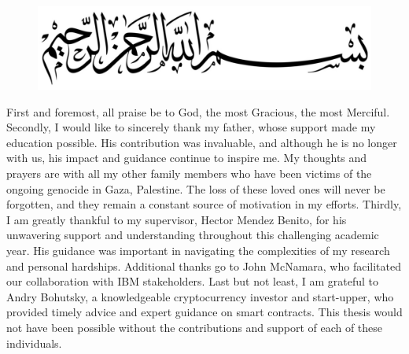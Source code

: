 \begin{figure}[h!]
    \centering
    \includegraphics[width=0.92\linewidth]{LATEX/Appendices/Images/Acknowledgment/bismilLah.jpg}
    \label{fig:beesmiLah}
\end{figure}
\vspace{-10pt}

\hspace{-6.53mm}  First and foremost, all praise be to God, the most Gracious, the most Merciful. Secondly, I would like to sincerely thank my father, whose support made my education possible. His contribution was invaluable, and although he is no longer with us, his impact and guidance continue to inspire me. My thoughts and prayers are with all my other family members who have been victims of the ongoing genocide in Gaza, Palestine. The loss of these loved ones will never be forgotten, and they remain a constant source of motivation in my efforts. Thirdly, I am greatly thankful to my supervisor, Hector Mendez Benito, for his unwavering support and understanding throughout this challenging academic year. His guidance was important in navigating the complexities of my research and personal hardships. Additional thanks go to John McNamara, who facilitated our collaboration with IBM stakeholders. Last but not least, I am grateful to Andry Bohutsky, a knowledgeable cryptocurrency investor and start-upper, who provided timely advice and expert guidance on smart contracts. This thesis would not have been possible without the contributions and support of each of these individuals.
